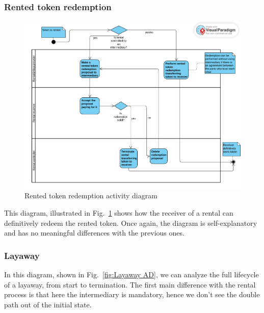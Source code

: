 \documentclass[english, LaM, oneside]{sapthesis}%
\begin{document}
\subsubsection{Rented token redemption}

\begin{figure}[H]
    \centering
        \begin{adjustbox}{width=1\textwidth}
            \includegraphics{ActivityDiagrams/activity_rentedTokenRedemption.pdf} 
        \end{adjustbox}
    \caption{Rented token redemption activity diagram}
    \label{fig:RentedTokenRedemption AD}
\end{figure}

This diagram, illustrated in Fig.~\ref{fig:RentedTokenRedemption AD} shows how the receiver of a rental can definitively redeem the rented token. Once again, the diagram is self-explanatory and has no meaningful differences with the previous ones.

\subsubsection{Layaway}

In this diagram, shown in Fig.~\ref{fig:Layaway AD}, we can analyze the full lifecycle of a layaway, from start to termination. The first main difference with the rental process is that here the intermediary is mandatory, hence we don't see the double path out of the initial state.
\end{document}
